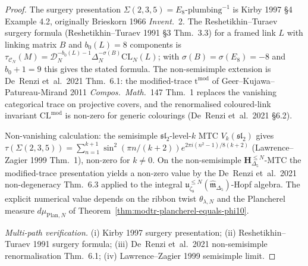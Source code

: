 \begin{proof}
The surgery presentation $\Sigma(2, 3, 5) = E_8\text{-plumbing}^{-1}$
is Kirby 1997 \S 4 Example 4.2, originally Brieskorn 1966
\emph{Invent.}~2. The Reshetikhin--Turaev surgery formula
(Reshetikhin--Turaev 1991 \S 3 Thm.~3.3) for a framed link $L$ with
linking matrix $B$ and $b_0(L) = 8$ components is
\(\tau_{\mathcal C_N}(M) =
\mathcal D_N^{-b_0(L)-1}\Delta_N^{-\sigma(B)}
\mathrm{CL}_N(L)\); with $\sigma(B) = \sigma(E_8) = -8$ and $b_0 + 1 = 9$
this gives the stated formula. The non-semisimple extension is
De~Renzi et~al.\ 2021 Thm.~6.1: the modified-trace $\mathrm{t}^{\mathrm{mod}}$
of Geer--Kujawa--Patureau-Mirand 2011 \emph{Compos.~Math.}~147
Thm.~1 replaces the vanishing categorical trace on projective
covers, and the renormalised coloured-link invariant
$\mathrm{CL}^{\mathrm{mod}}$ is non-zero for generic colourings
(De~Renzi et~al.\ 2021 \S 6.2).

Non-vanishing calculation: the semisimple $\mathfrak{sl}_2$-level-$k$ MTC
$V_k(\mathfrak{sl}_2)$ gives
$\tau(\Sigma(2, 3, 5)) = \sum_{n=1}^{k+1}\sin^2(\pi n/(k+2))
e^{2\pi i(n^2-1)/8(k+2)}$
(Lawrence--Zagier 1999 Thm.~1), non-zero for $k\neq 0$. On the
non-semisimple \(\mathbf H_{\Delta_5}^{\leq N}\)-MTC the modified-trace
presentation yields a non-zero value by the De~Renzi et~al.\ 2021
non-degeneracy Thm.~6.3 applied to the integral
\(\mathfrak u_{\zeta_8}^{\leq N}(\widehat{\mathfrak m}_{\Delta_5})\)-Hopf
algebra.
The explicit numerical value depends on the ribbon twist
\(\theta_{\lambda,N}\) and the Plancherel measure \(d\mu_{\mathrm{Plan},N}\)
of Theorem~\ref{thm:modtr-plancherel-equals-phi10}.

\emph{Multi-path verification.}
(i) Kirby 1997 surgery presentation;
(ii) Reshetikhin--Turaev 1991 surgery formula;
(iii) De~Renzi et~al.\ 2021 non-semisimple renormalisation Thm.~6.1;
(iv) Lawrence--Zagier 1999 semisimple limit.
\end{proof}


